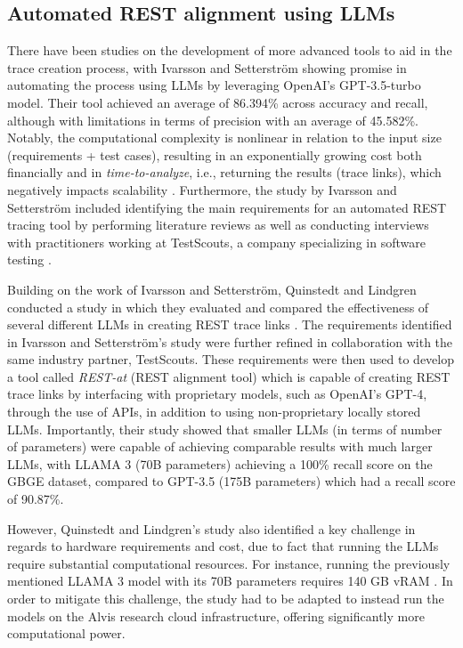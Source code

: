\documentclass[conference]{IEEEtran}
\begin{document}
\subsection{Automated REST alignment using LLMs} 

There have been studies on the development of more advanced tools to aid in the
trace creation process, with Ivarsson and Setterström showing promise in
automating the process using LLMs by leveraging OpenAI’s GPT-3.5-turbo
model\cite{ivarsson2023automated}. Their tool achieved an average of 86.394\%
across accuracy and recall, although with limitations in terms of precision with
an average of 45.582\%. Notably, the computational complexity is nonlinear in
relation to the input size (requirements + test cases), resulting in an
exponentially growing cost both financially and in \textit{time-to-analyze},
i.e., returning the results (trace links), which negatively impacts scalability
\cite{ivarsson2023automated}. Furthermore, the study by Ivarsson and Setterström
included identifying the main requirements for an automated REST tracing tool by
performing literature reviews as well as conducting interviews with
practitioners working at TestScouts, a
company specializing in software testing \cite{ivarsson2023automated}.

Building on the work of Ivarsson and Setterström, Quinstedt and Lindgren
conducted a study in which they evaluated and compared the effectiveness of
several different LLMs in creating REST trace links
\cite{quinstedt2024Optimizing}. The requirements identified in Ivarsson and
Setterström's study \cite{ivarsson2023automated} were further refined in
collaboration with the same industry partner, TestScouts. These requirements
were then used to develop a tool called \textit{REST-at} (REST alignment tool)
which is capable of creating REST trace links by interfacing with proprietary
models, such as OpenAI's GPT-4, through the use of APIs, in addition to using
non-proprietary locally stored LLMs. Importantly, their study showed that
smaller LLMs (in terms of number of parameters) were capable of achieving
comparable results with much larger LLMs, with LLAMA 3 (70B parameters)
achieving a 100\% recall score on the GBGE dataset, compared to GPT-3.5 (175B
parameters) which had a recall score of 90.87\%. 


However, Quinstedt and Lindgren's study also identified a key challenge in
regards to hardware requirements and cost, due to fact that running the LLMs
require substantial computational resources. For instance, running the
previously mentioned LLAMA 3 model with its 70B parameters requires 140 GB vRAM
\cite{quinstedt2024Optimizing}. In order to mitigate this challenge, the study
had to be adapted to instead run the models on the Alvis research cloud 
infrastructure, offering significantly more computational power.
\end{document}

